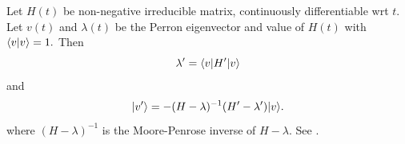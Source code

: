 \documentclass[12pt]{article}
\begin{document}
Let $H(t)$ be non-negative irreducible matrix, continuously
differentiable wrt $t.$
Let $v(t)$ and $\lambda(t)$ be the Perron eigenvector and value of $H(t)$
with $\langle{v}|{v}\rangle=1.$
Then
$$
    \lambda' = \langle{v}|H'|{v}\rangle
$$
and
$$
    |{v'}\rangle = -(H-\lambda)^{-1}(H' - \lambda')|{v}\rangle.
$$
where $(H-\lambda)^{-1}$ is the Moore-Penrose inverse of $H-\lambda.$ See \cite{Meyer1988}.


%
%


%
%
%
%


%
%
\end{document}
